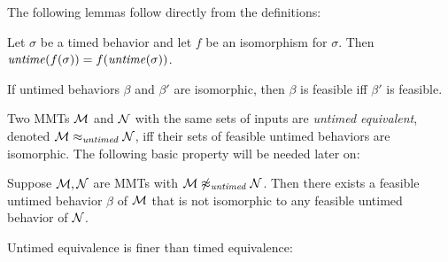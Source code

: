 The following lemmas follow directly from the definitions:
\begin{lemma}
\label{lemma isomorphism}
Let $\sigma$ be a timed behavior and let $f$ be an isomorphism for $\sigma$.
Then $\mathit{untime}(f(\sigma)) = f(\mathit{untime}(\sigma))$.
\end{lemma}
\begin{lemma}
If untimed behaviors $\beta$ and $\beta'$ are isomorphic, then $\beta$ is feasible iff $\beta'$ is feasible.
\end{lemma}

Two MMTs ${\mathcal M}$ and ${\mathcal N}$ with the same sets of inputs are \emph{untimed equivalent}, denoted ${\mathcal M} \approx_{\mathit{untimed}} {\mathcal N}$, iff their sets of feasible untimed behaviors are isomorphic. The following basic property will be needed later on:

\begin{lemma}
\label{not untimed}
Suppose ${\mathcal M}, {\mathcal N}$ are MMTs with ${\mathcal M} \not\approx_{\mathit{untimed}} {\mathcal N}$.
Then there exists a feasible untimed behavior $\beta$ of ${\mathcal M}$ that is not isomorphic to any feasible untimed behavior of ${\mathcal N}$.
\end{lemma}

Untimed equivalence is finer than timed equivalence:

